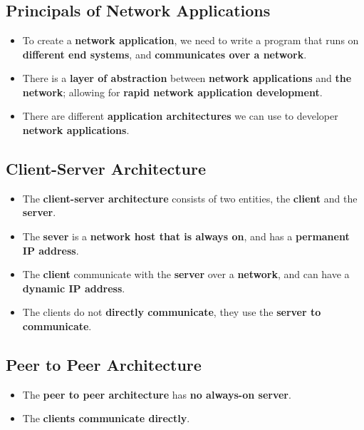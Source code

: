 \documentclass[16pt]{article}
\begin{document}
    \section*{}

    \subsection*{Principals of Network Applications}
    \begin{itemize}
        \item To create a \textbf{network application}, we need to write a program that runs on \textbf{different end systems}, and \textbf{communicates over a network}.
        \item There is a \textbf{layer of abstraction} between \textbf{network applications} and \textbf{the network}; allowing for \textbf{rapid network application development}.
        \item There are different \textbf{application architectures} we can use to developer \textbf{network applications}.
    \end{itemize}

    \subsection*{Client-Server Architecture}
    \begin{itemize}
        \item The \textbf{client-server architecture} consists of two entities, the \textbf{client} and the \textbf{server}.
        \item The \textbf{sever} is a \textbf{network host that is always on}, and has a \textbf{permanent IP address}.
        \item The \textbf{client} communicate with the \textbf{server} over a \textbf{network}, and can have a \textbf{dynamic IP address}.
        \item The clients do not \textbf{directly communicate}, they use the \textbf{server to communicate}.
    \end{itemize}

    \subsection*{Peer to Peer Architecture}
    \begin{itemize}
        \item The \textbf{peer to peer architecture} has \textbf{no always-on server}.
        \item The \textbf{clients communicate directly}.
    \end{itemize}
\end{document}
